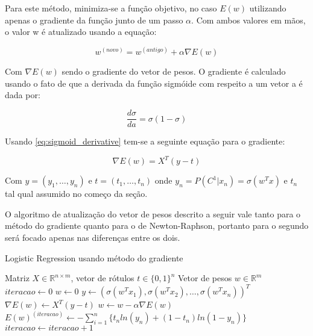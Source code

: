 Para este método, minimiza-se a função objetivo, no caso $E(w)$ utilizando apenas o gradiente
da função junto de um passo $\alpha$. Com ambos valores em mãos, o valor w é atualizado usando
a equação:

\begin{center}
	\begin{equation}
		w^{ ( novo )} = w^{ (antigo) }  + \alpha \nabla E(w)
	\end{equation}
\end{center}

Com $\nabla E(w)$ sendo o gradiente do vetor de pesos. O gradiente é calculado usando o fato de que
a derivada da função sigmóide com respeito a um vetor a é dada por:

\begin{center}
	\begin{equation}
	\label{eq:sigmoid_derivative}
		\frac{d \sigma}{d a} = \sigma (1 - \sigma )
	\end{equation}
\end{center}

Usando \ref{eq:sigmoid_derivative} tem-se a seguinte equação para o gradiente:

\begin{center}
	\begin{equation}\label{eq:gradient}
		\nabla E(w) = X^T(y - t)
	\end{equation}
\end{center}

Com $y = (y_1, \ldots, y_n)$ e $t = (t_1, \ldots, t_n)$ onde
$y_n = P(C^1 | x_n) = \sigma(w^Tx)$ e $t_n$ tal qual assumido no começo da seção.

O algoritmo de atualização do vetor de pesos descrito a seguir vale tanto para o método
do gradiente quanto para o de Newton-Raphson, portanto para o segundo será focado apenas nas
diferenças entre os dois.


\begin{algorithm}[H]
	\caption{Logistic Regression usando método do gradiente}
	\begin{algorithmic}[1]
		\REQUIRE Matriz $ X \in \mathbb{R}^{n \times m} $, 
		vetor de rótulos $t \in \{0, 1\}^n$
		\ENSURE Vetor de pesos $w \in \mathbb{R}^m$
		\STATE $iteracao \leftarrow 0$
		\STATE $w \leftarrow 0$
		 \label{lst:line:condition}
			\STATE $y \leftarrow (\sigma(w^Tx_1), \sigma(w^Tx_2), \ldots, \sigma(w^Tx_n))^T$
			\STATE $\nabla E(w) \leftarrow X^T(y - t)$
			\STATE $w \leftarrow w - \alpha \nabla E(w)$
			\STATE $E(w)^{ (iteracao) } \leftarrow 
			- \sum_{i = 1}^{n} \{ t_nln(y_n) + (1 - t_n) ln(1 - y_n) \}$
			\STATE $iteracao \leftarrow iteracao + 1$
		\ENDWHILE
	\end{algorithmic}
\end{algorithm}

